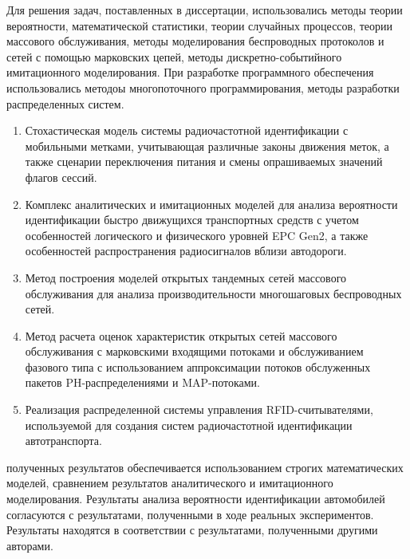 {\methods} Для решения задач, поставленных в диссертации, использовались методы теории вероятности, математической статистики, теории случайных процессов, теории массового обслуживания, методы моделирования беспроводных протоколов и сетей с помощью марковских цепей, методы дискретно-событийного имитационного моделирования. При разработке программного обеспечения использовались методоы многопоточного программирования, методы разработки распределенных систем.

{}
\begin{enumerate}[beginpenalty=10000] %
  \item Стохастическая модель системы радиочастотной идентификации с мобильными метками, учитывающая различные законы движения меток, а также сценарии переключения питания и смены опрашиваемых значений флагов сессий.
  \item Комплекс аналитических и имитационных моделей для анализа вероятности идентификации быстро движущихся транспортных средств с учетом особенностей логического и физического уровней EPC Gen2, а также особенностей распространения радиосигналов вблизи автодороги.
  \item Метод построения моделей открытых тандемных сетей массового обслуживания для анализа производительности многошаговых беспроводных сетей.
  \item Метод расчета оценок характеристик открытых сетей массового обслуживания с марковскими входящими потоками и обслуживанием фазового типа с использованием аппроксимации потоков обслуженных пакетов PH-распределениями и MAP-потоками.
  \item Реализация распределенной системы управления RFID-считывателями, используемой для создания систем радиочастотной идентификации автотранспорта.
\end{enumerate}

{\reliability} полученных результатов обеспечивается использованием строгих математических моделей, сравнением результатов аналитического и имитационного моделирования. Результаты анализа вероятности идентификации автомобилей согласуются с результатами, полученными в ходе реальных экспериментов. Результаты находятся в соответствии с результатами, полученными другими авторами.


